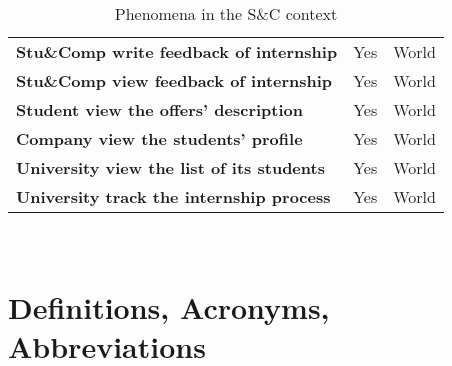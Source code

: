 \begin{table}[H]
\begin{tabular}{|p{20em}|c|c|}
    \textbf{Stu\&Comp write feedback of internship} & Yes & World \T\B\\
    \textbf{Stu\&Comp view feedback of internship} & Yes & World \B\\
    \textbf{Student view the offers' description} & Yes & World \T\B \\
    \textbf{Company view the students' profile} & Yes & World \T\B\\
    \textbf{University view the list of its students} & Yes & World \B\\
    \textbf{University track the internship process} & Yes & World \T\B\\
    \hline
    \end{tabular}
    \\[10pt]
    \caption{Phenomena in the S\&C context}
    \label{table:phenomena}
\end{table}

\section{Definitions, Acronyms, Abbreviations}
\label{sec:definitions}
